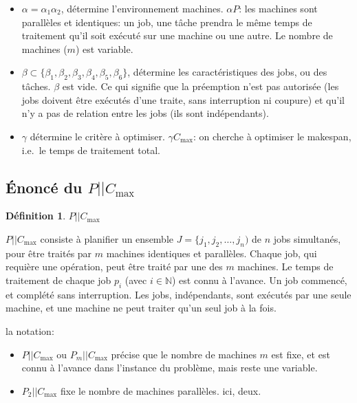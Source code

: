 \documentclass[a4paper,12pt]{report}
\theoremstyle{plain}				%
\theoremstyle{definition}				%
\newtheorem{definition}{Définition} %
\newcommand\problemGrahamPm{$P_m||C_{\max}$\xspace}
\newcommand\problemGrahamPII{$P_2||C_{\max}$\xspace}	%
\newcommand\problemGrahamP{$P||C_{\max}$\xspace}
\begin{document}
\begin{itemize}

\item $\alpha = \alpha_1 \alpha_2$, détermine l'environnement
  machines.
  $\alpha P$: les machines sont parallèles et identiques: un job,
  une tâche prendra le même temps de traitement qu'il soit exécuté sur
  une machine ou une autre.
  Le nombre de machines ($m$) est variable.

\item $\beta \subset \{ \beta_1, \beta_2, \beta_3,
  \beta_4, \beta_5, \beta_6\}$, détermine les caractéristiques
  des jobs, ou des tâches.
  $\beta$ est vide.
  Ce qui signifie que la préemption n'est pas autorisée (les jobs
  doivent être exécutés d'une traite, sans interruption ni coupure)
  et qu'il n'y a pas de relation entre les jobs (ils sont
  indépendants).

\item $\gamma $ détermine le critère à optimiser.
$\gamma C_{\max}$: on cherche à optimiser le makespan,
i.e.\ le temps de traitement total.

\end{itemize}

\bigskip

\subsection{Énoncé du \problemGrahamP}


\begin{definition}{\problemGrahamP}

  \problemGrahamP consiste à planifier un ensemble $J = \{j_1,j_2,\ldots,j_n)$
  de $n$ jobs simultanés, pour être traités par $m$ machines identiques et
  parallèles.
  Chaque job, qui requière une opération, peut être traité par une des
  $m$ machines.
  Le temps de traitement de chaque job $p_i$ (avec $i \in \mathbb{N}$) est connu à l'avance.
  Un job commencé, et complété sans interruption.
  Les jobs, indépendants, sont exécutés par une seule machine, et une
  machine ne peut traiter qu'un seul job à la fois.

la notation:
\begin{itemize}
\item \problemGrahamP ou \problemGrahamPm précise que le nombre de
  machines $m$ est fixe, et est connu à l'avance dans l'instance du
  problème, mais reste une variable.
\item \problemGrahamPII fixe le nombre de machines parallèles.
  ici, deux.
\end{itemize}

\end{definition}
\end{document}
